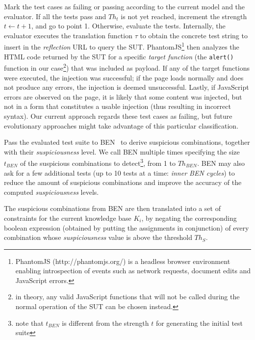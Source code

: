\begin{tikzborder}{\cite{Gargantini16:validation}}
\begin{tikzborder}{\cite{gargantini_combinatorial_2017}}
\begin{tikzborder}{\cite{garn2019}}
\begin{inparaenum}
\item  Mark the test cases as failing or passing according to the current model and the evaluator. 
If all the tests pass and $Th_t$ is not yet reached, increment the strength $t \gets t+1$, and go to point 1. 
Otherwise, evaluate the tests.
Internally, the evaluator executes the translation function $\tau$ to obtain the concrete test string to insert in the \textit{reflection} URL to query the SUT. PhantomJS\footnote{PhantomJS (http://phantomjs.org/) is a headless browser environment enabling introspection of events such as network requests, document edits and JavaScript errors.} then analyzes the HTML code returned by the SUT for a specific \textit{target function} (the \texttt{alert()} function in our case\footnote{in theory, any valid JavaScript functions that will not be called during the normal operation of the SUT can be chosen instead.}) that was included as payload. 
If any of the target functions were executed, the injection was successful; if the page loads normally and does not produce any errors, the injection is deemed unsuccessful.
Lastly, if JavaScript errors are observed on the page, it is likely that some content was injected, but not in a form that constitutes a usable injection (thus resulting in incorrect syntax).
Our current approach regards these test cases as failing, but future evolutionary approaches might take advantage of this particular classification.

\item Pass the evaluated test suite to BEN~\cite{ghandehari2018combinatorial} to derive suspicious combinations, together with their \textit{suspiciousness} level.
We call BEN multiple times specifying the size $t_{BEN}$ of the suspicious combinations to detect\footnote{note that $t_{BEN}$ is different from the strength $t$ for generating the initial test suite}, from 1 to $Th_{BEN}$.
BEN may also ask for a few additional tests (up to 10 tests at a time: \emph{inner BEN cycles}) to reduce the amount of suspicious combinations and improve the accuracy of the computed \emph{suspiciousness} levels.

\item The suspicious combinations from BEN are then translated into a set of constraints for the current knowledge base $K_i$, by negating the corresponding boolean expression (obtained by putting the assignments in conjunction) of every combination whose \textit{suspiciousness} value is above the threshold $Th_S$.  


\end{inparaenum}
\end{tikzborder}
\end{tikzborder}
\end{tikzborder}
